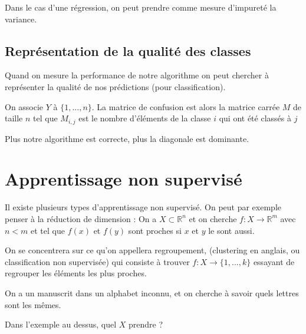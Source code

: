 \begin{rem}
	Dans le cas d'une régression, on peut prendre comme mesure d'impureté la variance.
\end{rem}

\subsection{Représentation de la qualité des classes}

Quand on mesure la performance de notre algorithme on peut chercher à représenter la qualité de nos prédictions (pour classification).

\begin{definition}
	On associe $Y$ à $\{1, \dots, n\}$. La matrice de confusion est alors la matrice carrée $M$ de taille $n$ tel que $M_{i,j}$ est le nombre d'éléments de la classe $i$ qui ont été classés à $j$
\end{definition}

\begin{proposition}
	Plus notre algorithme est correcte, plus la diagonale est dominante.
\end{proposition}

\section{Apprentissage non supervisé}

\begin{rem}
	Il existe plusieurs types d'apprentissage non supervisé. On peut par exemple penser à la réduction de dimension : On a $X\subset \mathbb R^n$ et on cherche $f : X \to \mathbb R^m$ avec $n < m$ et tel que $f(x)$ et $f(y)$ sont proches si $x$ et $y$ le sont aussi.
	
	On se concentrera sur ce qu'on appellera regroupement, (clustering en anglais, ou classification non supervisée) qui consiste à trouver $f : X \to \{1, ..., k\}$ essayant de regrouper les éléments les plus proches.
\end{rem}

\begin{example}
	On a un manuscrit dans un alphabet inconnu, et on cherche à savoir quels lettres sont les mêmes.
\end{example}

\begin{exercise}
	Dans l'exemple au dessus, quel $X$ prendre ?
\end{exercise}

